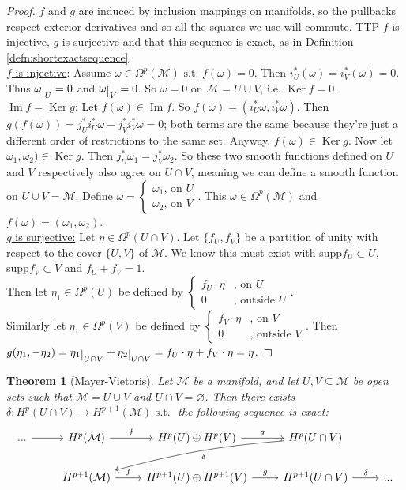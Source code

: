 \documentclass[10pt]{article}
\theoremstyle{plain}
\newtheorem{thm}{Theorem}[section] %
\theoremstyle{definition}
\newcommand{\st}{\text{ s.t. }}
\newcommand{\man}{\mathcal{M}}
\newcommand{\pformman}[1]{\Omega^{#1}(\man)}
\def\restrict#1{\raise-.5ex\hbox{\ensuremath|}_{#1}}
\DeclareMathOperator{\Ker}{Ker}
\DeclareMathOperator{\Ima}{Im}
\newcommand{\UintV}{U\cap V}
\newcommand{\mysection}[1]{
    \setcounter{thm}{0}
    \section*{#1}
    \addcontentsline{toc}{section}{#1}
    \addtocounter{section}{1}
    \setcounter{subsection}{0}

}
\begin{document}
\begin{proof}
$f$ and $g$ are induced by inclusion mappings on manifolds, so the pullbacks respect exterior derivatives and so all the squares we use will commute. TTP $f$ is injective, $g$ is surjective and that this sequence is exact, as in Definition \ref{defn:shortexactsequence}.\\
\underline{$f$ is injective}: Assume $\omega \in \pformman{p} \st f(\omega) = 0.$ Then $i_U^*(\omega) = i_V^*(\omega) = 0.$ Thus $\omega\restrict{U} =0 $ and $\omega \restrict{V} = 0$. So $\omega = 0$ on $\man = U\cup V$, i.e. $\Ker f = 0$.\\
$\underline{\Ima f = \Ker g}$: Let $f(\omega) \in \Ima f$. So $f(\omega) = (i_U^*\omega, i_V^*\omega).$ Then $g(f(\omega)) = j_U^* i_U^* \omega - j_V^*i_V^*\omega = 0 $; both terms are the same because they're just a different order of restrictions to the same set. Anyway, $f(\omega) \in \Ker g$. Now let $\omega_1,\omega_2)\in \Ker g.$ Then $j_U^* \omega_1 = j_V^* \omega_2$. So these two smooth functions defined on $U$ and $V$ respectively also agree on $\UintV$, meaning we can define a smooth function on $U\cup V = \man$. Define $\omega = \begin{cases} \omega_1 \text{, on } U \\ \omega_2  \text{, on }V \end{cases}$. This $\omega \in \pformman{p}$ and $f(\omega) = (\omega_1,\omega_2)$. \\
\underline{$g$ is surjective:} Let $\eta \in \Omega^p(\UintV).$ Let $\{f_U,f_V\}$ be a partition of unity with respect to the cover $\{U,V\}$ of $\man$. We know this must exist with supp$f_U \subset U$, supp$f_V\subset V$ and $f_U + f_V = 1$.\\
Then let $\eta_1\in \Omega^p(U)$ be defined by  $\begin{cases} f_U\cdot \eta &\text{, on } U \\ 0  &\text{, outside } U \end{cases}$.\\
Similarly let $\eta_1\in \Omega^p(V)$ be defined by  $\begin{cases} f_V\cdot \eta &\text{, on } V \\ 0  &\text{, outside } V \end{cases}$. Then $g(\eta_1 ,- \eta_2) = \eta_1 \restrict{\UintV} + \eta_2\restrict{\UintV} = f_U \cdot\eta + f_V \cdot \eta = \eta$.
\end{proof}
\begin{thm}[Mayer-Vietoris]\label{thm:mayervietoris}
Let $\man$ be a manifold, and let $U,V\subseteq \man$ be open sets such that $\man = U \cup V$ and $\UintV = \varnothing$. Then there exists $\delta : H^p(\UintV) \to H^{p+1}(\man) \st$ the following sequence is exact:
$$\begin{tikzcd}
... \arrow[r] & H^p(\mathcal{M}) \arrow[r, "f"]     & H^p(U)\oplus H^p(V) \arrow[r, "g"]         & H^p(\UintV) \arrow[lld, "\delta",bend right = 5] &     \\
              & H^{p+1}(\mathcal{M}) \arrow[r, "f"] & H^{p+1}(U)\oplus H^{p+1}(V) \arrow[r, "g"] & H^{p+1}(\UintV) \arrow[r, "\delta"]                          & ...
\end{tikzcd}$$
\end{thm}
\end{document}
